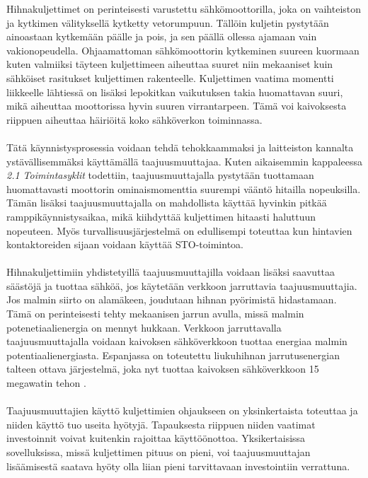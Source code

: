 \documentclass[finnish,12pt,a4paper,pdftex,elec,utf8]{aaltothesis}
\begin{document}
\noindent
Hihnakuljettimet on perinteisesti varustettu sähkömoottorilla, joka on vaihteiston ja kytkimen välityksellä kytketty vetorumpuun. Tällöin kuljetin pystytään ainoastaan kytkemään päälle ja pois, ja sen päällä ollessa ajamaan vain vakionopeudella. Ohjaamattoman sähkömoottorin kytkeminen suureen kuormaan kuten valmiiksi täyteen kuljettimeen aiheuttaa suuret niin mekaaniset kuin sähköiset rasitukset kuljettimen rakenteelle. Kuljettimen vaatima momentti liikkeelle lähtiessä on lisäksi lepokitkan vaikutuksen takia huomattavan suuri, mikä aiheuttaa moottorissa hyvin suuren virrantarpeen. Tämä voi kaivoksesta riippuen aiheuttaa häiriöitä koko sähköverkon toiminnassa. \cite{MyyntiHaastattelu}
\\\\
Tätä käynnistysprosessia voidaan tehdä tehokkaammaksi ja laitteiston kannalta ystävällisemmäksi käyttämällä taajuusmuuttajaa. Kuten aikaisemmin kappaleessa \textit{2.1 Toimintasyklit} todettiin, taajuusmuuttajalla pystytään tuottamaan huomattavasti moottorin ominaismomenttia suurempi vääntö hitailla nopeuksilla. Tämän lisäksi taajuusmuuttajalla on mahdollista käyttää hyvinkin pitkää ramppikäynnistysaikaa, mikä kiihdyttää kuljettimen hitaasti haluttuun nopeuteen. Myös turvallisuusjärjestelmä on edullisempi toteuttaa kun hintavien kontaktoreiden sijaan voidaan käyttää STO-toimintoa. 
\\\\
Hihnakuljettimiin yhdistetyillä taajuusmuuttajilla voidaan lisäksi saavuttaa säästöjä ja tuottaa sähköä, jos käytetään verkkoon jarruttavia taajuusmuuttajia. Jos malmin siirto on alamäkeen, joudutaan hihnan pyörimistä hidastamaan. Tämä on perinteisesti tehty mekaanisen jarrun avulla, missä malmin potenetiaalienergia on mennyt hukkaan. Verkkoon jarruttavalla taajuusmuuttajalla voidaan kaivoksen sähköverkkoon tuottaa energiaa malmin potentiaalienergiasta. Espanjassa on toteutettu liukuhihnan jarrutusenergian talteen ottava järjestelmä, joka nyt tuottaa kaivoksen sähköverkkoon 15 megawatin tehon \cite{Rodriguez}.
\\\\
Taajuusmuuttajien käyttö kuljettimien ohjaukseen on yksinkertaista toteuttaa ja  niiden käyttö tuo useita hyötyjä. Tapauksesta riippuen niiden vaatimat investoinnit voivat kuitenkin rajoittaa käyttöönottoa. Yksikertaisissa sovelluksissa, missä kuljettimen pituus on pieni, voi taajuusmuuttajan lisäämisestä saatava hyöty olla liian pieni tarvittavaan investointiin verrattuna. 


\end{document}
